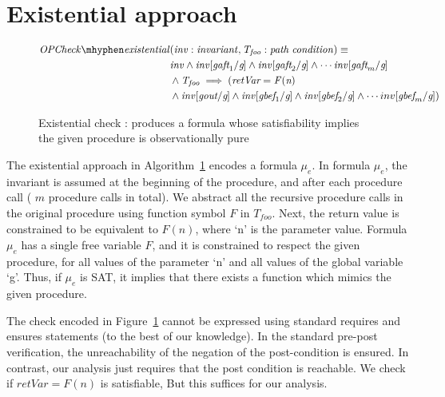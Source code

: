 \documentclass{llncs}
\newcommand{\foo}{\textit{foo}}
\newcommand{\inv}{\mathit{inv}}
\newcommand{\pathCondition}{\mathit{T_{\foo}}}
\newcommand{\OPCheckE}{\mathit{OPCheck \mhyphen existential}}
\newcommand{\mi}[1]{\mathit{#1}}
\newcommand{\retVar}{\textit{retVar}}
\newcommand{\F}{\mathit{F}}
\newcommand{\n}{\textit{n}}
\newcommand{\g}{\textit{g}}
\newcommand{\gout}{\textit{gout}}
\newcommand{\gbef}{\textit{gbef}}
\newcommand{\gaft}{\textit{gaft}}
\newcommand{\formula}{\mu}
\begin{document}
\section{Existential approach}\label{sec:existential}

\begin{figure}[htp]
  \begin{algorithm}[H]
    \begin{align*}
      \OPCheckE
       & \mi{(\inv :
        invariant, \pathCondition : path \; condition)} \equiv \\
      &\inv \wedge \inv[\gaft_1/\g] \wedge \inv[\gaft_2/\g] \wedge
      \cdots \inv[\gaft_m/\g] \\
      &\wedge \pathCondition \implies ( \retVar = \F(\n)\\
            & \wedge \inv[\gout/\g] \wedge  \inv[\gbef_1/\g] \wedge
      \inv[\gbef_2/\g] \wedge \cdots inv[\gbef_m/\g]) \\
    \end{align*}
    \caption{Existential check : produces a formula whose
      satisfiability implies the given procedure is observationally
      pure} 
    \label{algo:someOPcheckCombined}
  \end{algorithm}  
\end{figure}

The existential approach in Algorithm~\ref{algo:someOPcheckCombined}
encodes a formula $\formula_e$. In formula $\formula_e$, the invariant
is assumed at the beginning of the procedure, and after each procedure
call ( $m$ procedure calls in total).  We abstract all the recursive
procedure calls in the original procedure using function symbol $\F$
in $\pathCondition$.  Next, the return value is constrained to be
equivalent to $\F(n)$, where `n' is the parameter value. Formula
$\formula_e$ has a single free variable $\F$, and it is constrained to
respect the given procedure, for all values of the parameter `n' and
all values of the global variable `g'. Thus, if $\formula_e$ is SAT,
it implies that there exists a function which mimics the given
procedure. 

The check encoded in Figure~\ref{algo:someOPcheckCombined} cannot be
expressed using standard requires and ensures statements (to the best
of our knowledge). In the standard pre-post verification, the
unreachability of the negation of the post-condition is ensured. In
contrast, our analysis just requires that the post condition is
reachable. We check if $\retVar = \F(n)$ is satisfiable, But this
suffices for our analysis.
\end{document}
